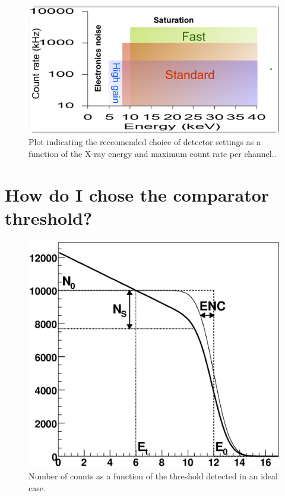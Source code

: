 \begin{figure}
\begin{center}
\includegraphics[width=\textwidth]{images/settings}
\end{center}
\caption{Plot indicating the reccomended choice of detector settings as a function of the X-ray energy and maximum count rate per channel..}\label{fig:settings}
\end{figure}


\section{How do I chose the comparator threshold?}

\begin{figure}[b!]
\begin{center}
\includegraphics[width=\textwidth]{images/thr_scan_expl}
\end{center}
\caption{Number of counts as a function of the threshold detected in an ideal case.}\label{fig:thrscan}
\end{figure}

